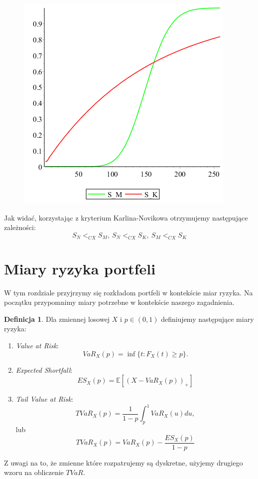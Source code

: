 \documentclass[12pt]{article}
\theoremstyle{twierdzenie}
\theoremstyle{definition}
\newtheorem{defi}{Definicja}[section]
\begin{document}
\begin{figure}[H]
\begin{center}
\includegraphics[scale=.5]{cdfPMPK}
\end{center}
\end{figure}

Jak widać, korzystając z kryterium Karlina-Novikowa otrzymujemy następujące zależności:
$$S_N<_{CX} S_M,\ S_N<_{CX} S_K,\ S_M<_{CX} S_K$$
\newpage
\section{Miary ryzyka portfeli}
W tym rozdziale przyjrzymy się rozkładom portfeli w kontekście miar ryzyka. Na początku przypomnimy miary potrzebne w kontekście naszego zagadnienia.
\begin{defi}
Dla zmiennej losowej $X$ i $p\in(0,1)$ definiujemy następujące miary ryzyka:
\begin{enumerate}
\item \textit{Value at Risk}:
$$VaR_X(p)=\inf\lbrace t:F_X(t)\geq p\rbrace.$$
\item \textit{Expected Shortfall}:
$$ES_X(p)=\mathbb{E}[(X-VaR_X(p))_+]$$
\item \textit{Tail Value at Risk}:
$$TVaR_X(p)=\frac{1}{1-p}\int_p^1 VaR_X(u)du,$$
lub
$$TVaR_X(p)=VaR_X(p)-\frac{ES_X(p)}{1-p}$$
\end{enumerate}
\end{defi}
Z uwagi na to, że zmienne które rozpatrujemy są dyskretne, użyjemy drugiego wzoru na obliczenie $TVaR$.
\end{document}
